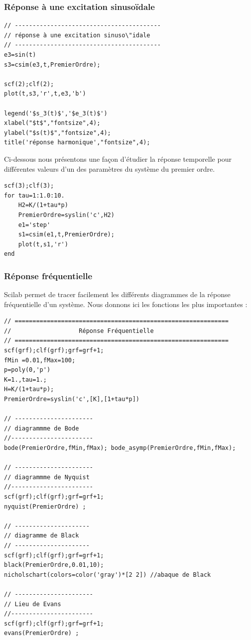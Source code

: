 \subsubsection{Réponse à une excitation sinuso\"idale}
\begin{code}
\begin{verbatim}
// -----------------------------------------
// réponse à une excitation sinuso\"idale 
// -----------------------------------------
e3=sin(t)
s3=csim(e3,t,PremierOrdre);

scf(2);clf(2);
plot(t,s3,'r',t,e3,'b')

legend('$s_3(t)$','$e_3(t)$')
xlabel("$t$","fontsize",4);
ylabel("$s(t)$","fontsize",4); 
title('réponse harmonique',"fontsize",4);
\end{verbatim}
\end{code}

Ci-dessous nous présentons une façon d'étudier la réponse temporelle pour
différentes valeurs d'un des paramètres du système du premier ordre.
\begin{code}
\begin{verbatim}
scf(3);clf(3);
for tau=1:1.0:10.
    H2=K/(1+tau*p)
    PremierOrdre=syslin('c',H2)
    e1='step'
    s1=csim(e1,t,PremierOrdre);
    plot(t,s1,'r')
end
\end{verbatim}
\end{code}


\subsubsection{Réponse fréquentielle}
Scilab permet de tracer facilement les différents diagrammes de la réponse fréquentielle d'un système.
Nous donnons ici les fonctions les plus importantes : 
\begin{code}
\begin{verbatim}
// ============================================================
//                   Réponse Fréquentielle
// ============================================================
scf(grf);clf(grf);grf=grf+1;
fMin =0.01,fMax=100;
p=poly(0,'p')
K=1.,tau=1.;
H=K/(1+tau*p);
PremierOrdre=syslin('c',[K],[1+tau*p])

// ----------------------
// diagrammme de Bode
//-----------------------
bode(PremierOrdre,fMin,fMax); bode_asymp(PremierOrdre,fMin,fMax);

// ----------------------
// diagrammme de Nyquist
//-----------------------
scf(grf);clf(grf);grf=grf+1;
nyquist(PremierOrdre) ;

// ---------------------
// diagramme de Black
// ---------------------
scf(grf);clf(grf);grf=grf+1;
black(PremierOrdre,0.01,10);
nicholschart(colors=color('gray')*[2 2]) //abaque de Black

// ----------------------
// Lieu de Evans
//-----------------------
scf(grf);clf(grf);grf=grf+1;
evans(PremierOrdre) ;
\end{verbatim}
\end{code}

